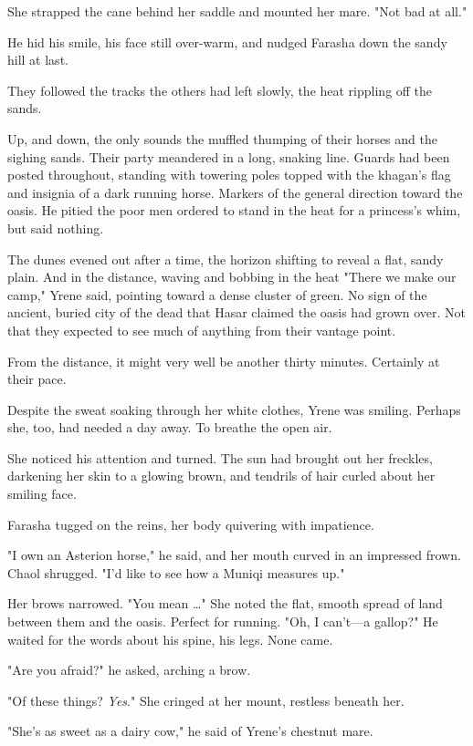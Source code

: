 She strapped the cane behind her saddle and mounted her mare.
"Not bad at all."

He hid his smile, his face still over-warm, and nudged Farasha down the sandy hill at last.

They followed the tracks the others had left slowly, the heat rippling off the sands.

Up, and down, the only sounds the muffled thumping of their horses and the sighing sands.
Their party meandered in a long, snaking line.
Guards had been posted throughout, standing with towering poles topped with the khagan's flag and insignia of a dark running horse.
Markers of the general direction toward the oasis.
He pitied the poor men ordered to stand in the heat for a princess's whim, but said nothing.

The dunes evened out after a time, the horizon shifting to reveal a flat, sandy plain.
And in the distance, waving and bobbing in the heat 
"There we make our camp," Yrene said, pointing toward a dense cluster of green.
No sign of the ancient, buried city of the dead that Hasar claimed the oasis had grown over.
Not that they expected to see much of anything from their vantage point.

From the distance, it might very well be another thirty minutes.
Certainly at their pace.

Despite the sweat soaking through her white clothes, Yrene was smiling.
Perhaps she, too, had needed a day away.
To breathe the open air.

She noticed his attention and turned.
The sun had brought out her freckles, darkening her skin to a glowing brown, and tendrils of hair curled about her smiling face.

Farasha tugged on the reins, her body quivering with impatience.

"I own an Asterion horse," he said, and her mouth curved in an impressed frown.
Chaol shrugged.
"I'd like to see how a Muniqi measures up."

Her brows narrowed.
"You mean \ldots" She noted the flat, smooth spread of land between them and the oasis.
Perfect for running.
"Oh, I can't---a gallop?"
He waited for the words about his spine, his legs.
None came.

"Are you afraid?"
he asked, arching a brow.

"Of these things?
\emph{Yes}."
She cringed at her mount, restless beneath her.

"She's as sweet as a dairy cow," he said of Yrene's chestnut mare.

